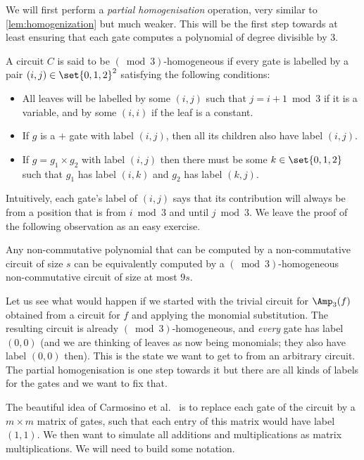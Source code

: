 We will first perform a \emph{partial homogenisation} operation, very similar to \autoref{lem:homogenization} but much weaker. This will be the first step towards at least ensuring that each gate computes a polynomial of degree divisible by $3$.

\begin{definition} A circuit $C$ is said to be $(\bmod{3})$-homogeneous if every gate is labelled by a pair $(i,j) \in \set{0,1,2}^2$ satisfying the following conditions:
  \begin{itemize}
  \item All leaves will be labelled by some $(i,j)$ such that $j = i+1 \bmod 3$ if it is a variable, and by some $(i,i)$ if the leaf is a constant.
  \item If $g$ is a $+$ gate with label $(i,j)$, then all its children also have label $(i,j)$.
  \item If $g = g_1 \times g_2$ with label $(i,j)$ then there must be some $k \in \set{0,1,2}$ such that $g_1$ has label $(i,k)$ and $g_2$ has label $(k,j)$. \qedhere
  \end{itemize}
\end{definition}

Intuitively, each gate's label of $(i,j)$ says that its contribution will always be from a position that is from $i \bmod 3$ and until $j\bmod 3$. We leave the proof of the following observation as an
easy exercise.

\begin{observation}
  Any non-commutative polynomial that can be computed by a non-commutative circuit of size $s$ can be equivalently computed by a $(\bmod{3})$-homogeneous non-commutative circuit of size at most $9s$.
\end{observation}

Let us see what would happen if we started with the trivial circuit for $\Amp_3(f)$ obtained from a circuit for $f$ and applying the monomial substitution. The resulting circuit is already $(\bmod{3})$-homogeneous, and \emph{every} gate has label $(0,0)$ (and we are thinking of leaves as now being monomials; they also have label $(0,0)$ then). This is the state we want to get to from an arbitrary circuit. The partial homogenisation is one step towards it but there are all kinds of labels for the gates and we want to fix that.

The beautiful idea of Carmosino et al.~\cite{CILM18} is to replace each gate of the circuit by a $m\times m$ matrix of gates, such that each entry of this matrix would have label $(1,1)$. We then want to simulate all additions and multiplications as matrix multiplications. We will need to build some notation.

